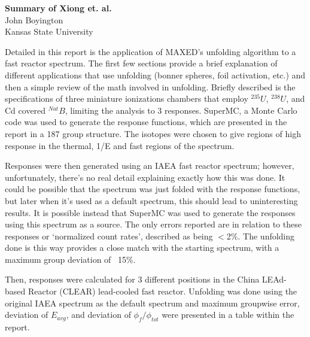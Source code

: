 \documentclass[a4paper, 11pt]{article}
\begin{document}
\thispagestyle{empty}
\noindent
\large\textbf{Summary of Xiong et. al.} \\
\hfill John Boyington \\
\hfill Kansas State University \\

\vspace{0.02\textheight}


Detailed in this report is the application of MAXED's unfolding algorithm to a fast reactor spectrum.
The first few sections provide a brief explanation of different applications that use unfolding (bonner spheres, foil activation, etc.) and then a simple review of the math involved in unfolding.
Briefly described is the specifications of three miniature ionizations chambers that employ ${}^{235}U$, ${}^{238}U$, and Cd covered ${}^{Nat}B$, limiting the analysis to 3 responses.
SuperMC, a Monte Carlo code was used to generate the response functions, which are presented in the report in a 187 group structure.
The isotopes were chosen to give regions of high response in the thermal, 1/E and fast regions of the spectrum.

Responses were then generated using an IAEA fast reactor spectrum; however, unfortunately, there's no real detail explaining exactly how this was done.
It could be possible that the spectrum was just folded with the response functions, but later when it's used as a default spectrum, this should lead to uninteresting results.
It is possible instead that SuperMC was used to generate the responses using this spectrum as a source.
The only errors reported are in relation to these responses or `normalized count rates', described as being $<$2\%.
The unfolding done is this way provides a close match with the starting spectrum, with a maximum group deviation of ~15\%.

Then, responses were calculated for 3 different positions in the China LEAd-based Reactor (CLEAR) lead-cooled fast reactor.
Unfolding was done using the original IAEA spectrum as the default spectrum and maximum groupwise error, deviation of $E_{avg}$, and deviation of $\phi_{f}/\phi_{tot}$ were presented in a table within the report.
\end{document}
